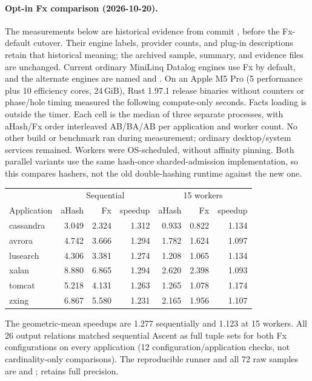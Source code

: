 \paragraph{Opt-in Fx comparison (2026-10-20).}
The measurements below are historical evidence from commit ,
before the Fx-default cutover. Their engine labels, provider counts, and
plug-in descriptions retain that historical meaning; the archived sample,
summary, and evidence files are unchanged. Current ordinary MiniLinq Datalog
engines use Fx by default, and the alternate engines are named
 and .
On an Apple M5 Pro (5 performance plus 10 efficiency cores, 24\,GiB),
Rust 1.97.1 release binaries without counters or phase/hole timing measured the
following compute-only seconds. Facts loading is outside the timer.
Each cell is the median of three separate processes, with aHash/Fx order
interleaved AB/BA/AB per application and worker count. No other build or
benchmark ran during measurement; ordinary desktop/system services remained.
Workers were OS-scheduled, without affinity pinning.
Both parallel variants use the same hash-once sharded-admission implementation,
so this compares hashers, not the old double-hashing runtime against the new one.
\begin{center}
\begin{tabular}{lrrrrrr}
\toprule
& \multicolumn{3}{c}{Sequential} & \multicolumn{3}{c}{15 workers}\\
Application & aHash & Fx & speedup & aHash & Fx & speedup\\
\midrule
cassandra & 3.049 & 2.324 & 1.312 & 0.933 & 0.822 & 1.134\\
avrora    & 4.742 & 3.666 & 1.294 & 1.782 & 1.624 & 1.097\\
lusearch  & 4.306 & 3.381 & 1.274 & 1.208 & 1.065 & 1.134\\
xalan     & 8.880 & 6.865 & 1.294 & 2.620 & 2.398 & 1.093\\
tomcat    & 5.218 & 4.131 & 1.263 & 1.265 & 1.078 & 1.174\\
zxing     & 6.867 & 5.580 & 1.231 & 2.165 & 1.956 & 1.107\\
\bottomrule
\end{tabular}
\end{center}
The geometric-mean speedups are 1.277 sequentially and 1.123 at 15 workers.
All 26 output relations matched sequential Ascent as full tuple sets for
both Fx configurations on every application (12 configuration/application
checks, not cardinality-only comparisons).
The reproducible runner and all 72 raw samples are
 and
;  retains full precision.


